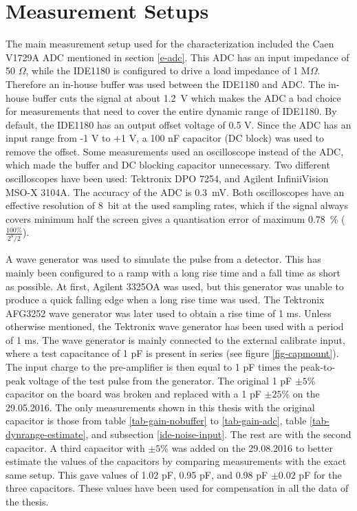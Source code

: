 \documentclass[../main/thesis.tex]{subfiles}
\begin{document}
\section{Measurement Setups}
\label{ide-setup}

The main measurement setup used for the characterization included the Caen V1729A \gls{ADC} mentioned in section \ref{e-adc}. This \gls{ADC} has an input impedance of 50 $\Omega$, while the IDE1180 is configured to drive a load impedance of 1 M$\Omega$. Therefore an in-house buffer was used between the IDE1180 and ADC. The in-house buffer cuts the signal at about 1.2~V which makes the \gls{ADC} a bad choice for measurements that need to cover the entire dynamic range of IDE1180. By default, the IDE1180 has an output offset voltage of 0.5 V. Since the ADC has an input range from -1 V to +1 V, a 100 nF capacitor (DC block) was used to remove the offset. Some measurements used an oscilloscope instead of the ADC, which made the buffer and DC blocking capacitor unnecessary. Two different oscilloscopes have been used: Tektronix DPO 7254, and Agilent InfiniiVision MSO-X 3104A. The accuracy of the ADC is 0.3~mV. Both oscilloscopes have an effective resolution of 8~bit at the used sampling rates, which if the signal always covers minimum half the screen gives a quantisation error of maximum 0.78~\% ($\frac{100\%}{2^8/2}$). %

A wave generator was used to simulate the pulse from a detector. This has mainly been configured to a ramp with a long rise time and a fall time as short as possible. At first, Agilent 3325OA was used, but this generator was unable to produce a quick falling edge when a long rise time was used. The Tektronix AFG3252 wave generator was later used to obtain a rise time of 1 ms. Unless otherwise mentioned, the Tektronix wave generator has been used with a period of 1 ms. The wave generator is mainly connected to the external calibrate input, where a test capacitance of 1 pF is present in series (see figure \ref{fig-capmount}). The input charge to the pre-amplifier is then equal to 1 pF times the peak-to-peak voltage of the test pulse from the generator. The original 1 pF $\pm5\%$ capacitor on the board was broken and replaced with a 1 pF $\pm25\%$ on the 29.05.2016. The only measurements shown in this thesis with the original capacitor is those from table \ref{tab-gain-nobuffer} to \ref{tab-gain-adc}, table \ref{tab-dynrange-estimate}, and subsection \ref{ide-noise-input}. The rest are with the second capacitor. A third capacitor with $\pm5\%$ was added on the 29.08.2016 to better estimate the values of the capacitors by comparing measurements with the exact same setup. This gave values of 1.02 pF, 0.95 pF, and 0.98 pF $\pm0.02$ pF for the three capacitors. These values have been used for compensation in all the data of the thesis.
\end{document}
